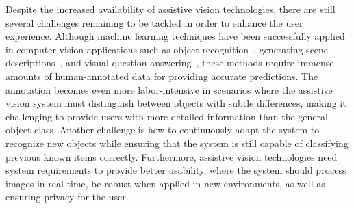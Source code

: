 Despite the increased availability of assistive vision technologies, there are still several challenges remaining to be tackled in order to enhance the user experience. Although machine learning techniques have been successfully applied in computer vision applications such as object recognition~\cite{krizhevsky2012imagenet, he2016deep, dosovitskiy2020image}, generating scene descriptions~\cite{xu2015show, johnson2016densecap, anderson2018bottom}, and visual question answering~\cite{antol2015vqa, hudson2019gqa, hu2019language}, these methods require immense amounts of human-annotated data for providing accurate predictions. The annotation becomes even more labor-intensive in scenarios where the assistive vision system must distinguish between objects with subtle differences, making it challenging to provide users with more detailed information than the general object class. Another challenge is how to continuously adapt the system to recognize new objects while ensuring that the system is still capable of classifying previous known items correctly. 
Furthermore, assistive vision technologies need system requirements to provide better usability, where the system should process images in real-time, be robust when applied in new environments, as well as ensuring privacy for the user.






